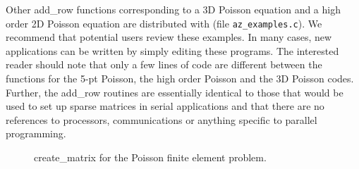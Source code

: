 Other {\sf add\_row} functions corresponding to a 3D Poisson equation and a
high order 2D Poisson equation are distributed with \Az{} (file
\verb'az_examples.c').  We recommend that potential users review these
examples.  In many cases, new applications can be written by simply editing
these programs.  The interested reader should note that only a few lines of
code are different between the functions for the 5-pt Poisson, the high order
Poisson and the 3D Poisson codes.  Further, the {\sf add\_row} routines are
essentially identical to those that would be used to set up sparse matrices in
serial applications and that there are no references to processors,
communications or anything specific to parallel programming.
\begin{figure}[Htbp]
\caption{{\sf create\_matrix} for the Poisson finite element
problem.}\label{fem}
\end{figure}

